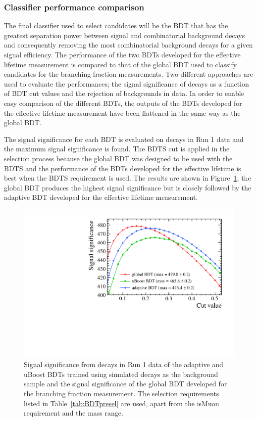 \subsubsection{Classifier performance comparison}

The final classifier used to select \bsmumu candidates will be the BDT that has the greatest separation power between signal and combinatorial background decays and consequently removing the most combinatorial background decays for a given signal efficiency. The performance of the two BDTs developed for the effective lifetime measurement is compared to that of the global BDT used to classify candidates for the branching fraction measurements. Two different approaches are used to evaluate the performances; the signal significance of \bhh decays as a function of BDT cut values and the rejection of \bsmumu backgrounds in data. In order to enable easy comparison of the different BDTs, the outputs of the BDTs developed for the effective lifetime measurement have been flattened in the same way as the global BDT. %

The signal significance for each BDT is evaluated on \bhh decays in Run 1 data and the maximum signal significance is found. The BDTS cut is applied in the selection process because the global BDT was designed to be used with the BDTS and the performance of the BDTs developed for the effective lifetime is best when the BDTS requirement is used. The results are shown in Figure~\ref{fig:SSall}, the global BDT produces the highest signal significance but is closely followed by the adaptive BDT developed for the effective lifetime measurement. 

\begin{figure}[htbp]
    \centering
        \includegraphics[width=0.6 \textwidth]{./Figs/Selection/BDT_comp_zoom.pdf}
    \caption{Signal significance from \bhh decays in Run 1 data of the adaptive and uBoost BDTs trained using simulated decays as the background sample and the signal significance of the global BDT developed for the branching fraction measurement. The selection requirements listed in Table~\ref{tab:BDTpresel} are used, apart from the isMuon requirement and the mass range. }
    \label{fig:SSall}
\end{figure}


